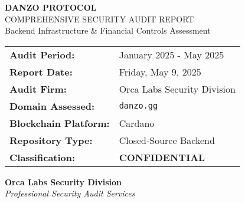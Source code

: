 \documentclass[11pt,a4paper]{article}
\begin{document}
\begin{titlepage}
    \centering
    \vspace*{1cm}
    
    {\Huge\bfseries\color{danzoBlue} DANZO PROTOCOL}\\[0.5cm]
    {\LARGE\color{danzoGray} COMPREHENSIVE SECURITY AUDIT REPORT}\\[1.5cm]
    
    {\large Backend Infrastructure \& Financial Controls Assessment}\\[2cm]
    
    \begin{tabular}{p{4cm}p{6cm}}
        \textbf{Audit Period:} & January 2025 - May 2025 \\[0.3cm]
        \textbf{Report Date:} & Friday, May 9, 2025 \\[0.3cm]
        \textbf{Audit Firm:} & Orca Labs Security Division \\[0.3cm]
        \textbf{Domain Assessed:} & \texttt{danzo.gg} \\[0.3cm]
        \textbf{Blockchain Platform:} & Cardano \\[0.3cm]
        \textbf{Repository Type:} & Closed-Source Backend \\[0.3cm]
        \textbf{Classification:} & \textcolor{danzoRed}{\textbf{CONFIDENTIAL}} \\[0.3cm]
    \end{tabular}
    
    \vfill
    
    \begin{center}
    \end{center}
    
    \vspace{1cm}
    
    {\large\textbf{Orca Labs Security Division}}\\
    {\textit{Professional Security Audit Services}}
    
\end{titlepage}
\end{document}
